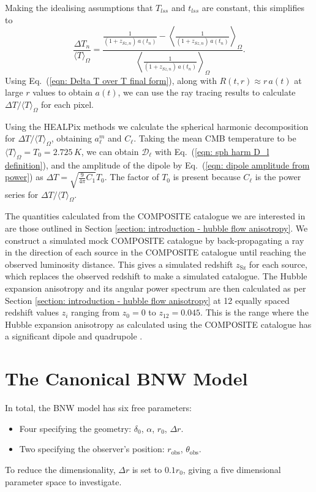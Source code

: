 \documentclass[a4paper,12pt]{report}
\renewcommand{\eqref}[1]{Eq.~({#1})}
\begin{document}
Making the idealising assumptions that $T_{lss}$ and $t_{lss}$ are constant, this simplifies to
\newcommand{\usefulCMBexp}[1]{\frac{1}{(1+z_{Sz,#1})\, a(t_{#1})}}
\begin{equation} \label{eqn: Delta T over T final form}
    \frac{\Delta T_n}{\langle T \rangle_\Omega} = \frac{\usefulCMBexp{n} - \left\langle\usefulCMBexp{n}\right\rangle_\Omega}{\left\langle\usefulCMBexp{n}\right\rangle_\Omega}.
\end{equation}
Using \eqref{\ref{eqn: Delta T over T final form}}, along with $R(t,r) \approx r\,a(t)$ at large $r$ values to obtain $a(t)$, we can use the ray tracing results to calculate $\Delta T / \langle T \rangle_\Omega$ for each pixel.

Using the HEALPix \cite{RN250} methods we calculate the spherical harmonic decomposition for $\Delta T / \langle T \rangle_\Omega$, obtaining $a^m_\ell$ and $C_\ell$. Taking the mean CMB temperature to be $\langle T \rangle_\Omega = T_0 = 2.725\, \si{K}$, we can obtain $\mathcal{D}_\ell$ with \eqref{\ref{eqn: sph harm D_l definition}}, and the amplitude of the dipole by \eqref{\ref{eqn: dipole amplitude from power}} as $\Delta T = \sqrt{\frac{9}{4\pi}C_1} T_0$. The factor of $T_0$ is present because $C_\ell$ is the power series for $\Delta T / \langle T \rangle_\Omega$.

The quantities calculated from the COMPOSITE catalogue we are interested in are those outlined in Section \ref{section: introduction - hubble flow anisotropy}.
We construct a simulated mock COMPOSITE catalogue by back-propagating a ray in the direction of each source in the COMPOSITE catalogue until reaching the observed luminosity distance. This gives a simulated redshift $z_{\text{Sz}}$ for each source, which replaces the observed redshift to make a simulated catalogue. The Hubble expansion anisotropy and its angular power spectrum are then calculated as per Section \ref{section: introduction - hubble flow anisotropy} at 12 equally spaced redshift values $z_i$ ranging from $z_0=0$ to $z_{12}=0.045$. This is the range where the Hubble expansion anisotropy as calculated using the COMPOSITE catalogue has a significant dipole and quadrupole \cite{RN3}.

\section{The Canonical BNW Model}
In total, the BNW model has six free parameters:
\begin{itemize}
    \item Four specifying the geometry: $\delta_0$, $\alpha$, $r_0$, $\Delta r$.
    \item Two specifying the observer's position: $r_{\text{obs}}$, $\theta_{\text{obs}}$.
\end{itemize}
To reduce the dimensionality, $\Delta r$ is set to $0.1 r_0$, giving a five dimensional parameter space to investigate.
\end{document}
